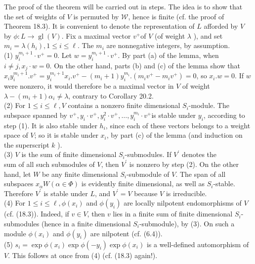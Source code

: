 \documentclass[10pt]{article}
\begin{document}
The proof of the theorem will be carried out in steps. The idea is to show that the set of weights of $V$ is permuted by $\mathscr{W}$, hence is finite (cf. the proof of Theorem 18.3). It is convenient to denote the representation of $L$ afforded by $V$ by $\phi: L \rightarrow \operatorname{gl}(V)$. Fix a maximal vector $v^{+}$of $V$ (of weight $\lambda$ ), and set $m_{i}=\lambda\left(h_{i}\right), 1 \leq i \leq \ell$. The $m_{i}$ are nonnegative integers, by assumption.\\
(1) $y_{i}^{m_{i}+1} \cdot v^{+}=0$. Let $w=y_{i}^{m_{i}+1} \cdot v^{+}$. By part (a) of the lemma, when $i \neq j, x_{j} \cdot w=0$. On the other hand, parts (b) and (c) of the lemma show that $x_{i} y_{i}^{m_{i}+1} . v^{+}=y_{i}^{m_{i}+1} x_{i} . v^{+}-\left(m_{i}+1\right) y_{i}^{m_{i}} .\left(m_{i} v^{+}-m_{i} v^{+}\right)=0$, so $x_{i} . w=0$. If $w$ were nonzero, it would therefore be a maximal vector in $V$ of weight $\lambda-\left(m_{i}+1\right) \alpha_{i} \neq \lambda$, contrary to Corollary 20.2.\\
(2) For $1 \leq i \leq \ell, V$ contains a nonzero finite dimensional $S_{i}$-module. The subspace spanned by $v^{+}, y_{i} \cdot v^{+}, y_{i}^{2} \cdot v^{+}, \ldots, y_{i}^{m_{i}} \cdot v^{+}$is stable under $y_{i}$, according to step (1). It is also stable under $h_{i}$, since each of these vectors belongs to a weight space of $V$; so it is stable under $x_{i}$, by part (c) of the lemma (and induction on the superscript $k$ ).\\
(3) $V$ is the sum of finite dimensional $S_{i}$-submodules. If $V^{\prime}$ denotes the\\
sum of all such submodules of $V$, then $V^{\prime}$ is nonzero by step (2). On the other hand, let $W$ be any finite dimensional $S_{i}$-submodule of $V$. The span of all subspaces $x_{\alpha} W(\alpha \in \Phi)$ is evidently finite dimensional, as well as $S_{i}$-stable. Therefore $V^{\prime}$ is stable under $L$, and $V^{\prime}=V$ because $V$ is irreducible.\\
(4) For $1 \leq i \leq \ell, \phi\left(x_{i}\right)$ and $\phi\left(y_{i}\right)$ are locally nilpotent endomorphisms of $V$ (cf. (18.3)). Indeed, if $v \in V$, then $v$ lies in a finite sum of finite dimensional $S_{i}$-submodules (hence in a finite dimensional $S_{i}$-submodule), by (3). On such a module $\phi\left(x_{i}\right)$ and $\phi\left(y_{i}\right)$ are nilpotent (cf. (6.4)).\\
(5) $s_{i}=\exp \phi\left(x_{i}\right) \exp \phi\left(-y_{i}\right) \exp \phi\left(x_{i}\right)$ is a well-defined automorphism of $V$. This follows at once from (4) (cf. (18.3) again!).\\
\end{document}
